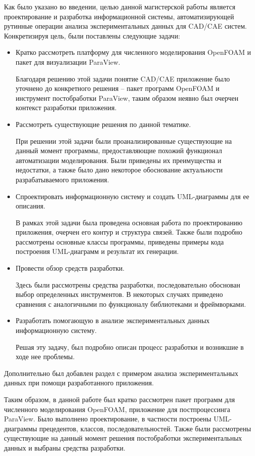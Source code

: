 \documentclass[14pt]{extreport}
\begin{document}
Как было указано во введении, целью данной магистерской работы является проектирование и разработка информационной системы, автоматизирующей рутинные операции анализа экспериментальных данных для CAD/CAE систем. 
Конкретизируя цель, были поставлены следующие задачи:
\begin{itemize}
	\item Кратко рассмотреть платформу для численного моделирования OpenFOAM и пакет для визуализации ParaView. 
	
	Благодаря решению этой задачи понятие CAD/CAE приложение было уточнено до конкретного решения -- пакет программ OpenFOAM и инструмент постобработки ParaView, таким образом неявно был очерчен контекст разработки приложения.
	\item Рассмотреть существующие решения по данной тематике.
	
	 При решении этой задачи были проанализированные существующие на данный момент программы, предоставляющие похожий функционал автоматизации моделирования. Были приведены их преимущества и недостатки, а также было дано некоторое обоснование актуальности разрабатываемого приложения.
	\item Спроектировать информационную систему и создать UML-диаграммы для ее описания. 
	
	В рамках этой задачи была проведена основная работа по проектированию приложения, очерчен его контур и структура связей. Также были подробно рассмотрены основные классы программы, приведены примеры кода построения UML-диаграмм и результат их генерации.
	\item Провести обзор средств разработки. 
	
	Здесь были рассмотрены средства разработки, последовательно обоснован выбор определенных инструментов. В некоторых случаях приведено сравнения с аналогичными по функционалу библиотеками и фреймворками.
	
	\item Разработать помогающую в анализе экспериментальных данных информационную систему.
	
	Решая эту задачу, был подробно описан процесс разработки и возникшие в ходе нее проблемы.
\end{itemize}

Дополнительно был добавлен раздел с примером анализа экспериментальных данных при помощи разработанного приложения.

Таким образом, в данной работе был кратко рассмотрен пакет программ для численного моделирования OpenFOAM, приложение для постпроцессинга ParaView. Было выполнено проектирование, в частности построены UML-диаграммы прецедентов, классов, последовательностей. Также были рассмотрены существующие на данный момент решения постобработки экспериментальных данных и выбраны средства разработки. 
\end{document}
